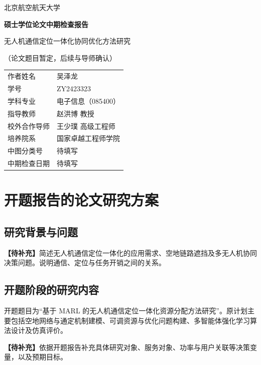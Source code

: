 \documentclass[UTF8,a4paper,12pt,fontset=fandol]{ctexart}
\newcommand{\pending}[1]{\par\noindent\textbf{【待补充】}#1\par}
\begin{document}
\begin{titlepage}
  \begin{center}
    {\Large 北京航空航天大学\par}
    \vspace{1.2cm}
    {\LARGE\bfseries 硕士学位论文中期检查报告\par}
    \vspace{1.6cm}
    {\Large 无人机通信定位一体化协同优化方法研究\par}
    \vspace{0.4cm}
    {\normalsize （论文题目暂定，后续与导师确认）\par}
    \vspace{1.4cm}
    \renewcommand{\arraystretch}{1.6}
    \begin{tabular}{ll}
      作者姓名 & 吴泽龙 \\
      学号 & ZY2423323 \\
      学科专业 & 电子信息（085400） \\
      指导教师 & 赵洪博 教授 \\
      校外合作导师 & 王少璞 高级工程师 \\
      培养院系 & 国家卓越工程师学院 \\
      中图分类号 & 待填写 \\
      中期检查日期 & 待填写 \\
    \end{tabular}
  \end{center}
\end{titlepage}

\tableofcontents
\clearpage

\section{开题报告的论文研究方案}

\subsection{研究背景与问题}
\pending{简述无人机通信定位一体化的应用需求、空地链路遮挡及多无人机协同决策问题。说明通信、定位与任务开销之间的关系。}

\subsection{开题阶段的研究内容}
开题题目为“基于 MARL 的无人机通信定位一体化资源分配方法研究”。原计划主要包括空地网络与通定机制建模、可调资源与优化问题构建、多智能体强化学习算法设计及仿真评价。
\pending{依据开题报告补充具体研究对象、服务对象、功率与用户关联等决策变量，以及预期目标。}
\end{document}
